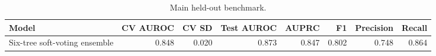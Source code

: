 \begin{table}[htbp]
\centering
\caption{Main held-out benchmark.}
\label{tab:main_benchmark_recomputed}
\begin{tabular}{lrrrrrrr}
\toprule
Model & CV AUROC & CV SD & Test AUROC & AUPRC & F1 & Precision & Recall \\
\midrule
Six-tree soft-voting ensemble & 0.848 & 0.020 & 0.873 & 0.847 & 0.802 & 0.748 & 0.864 \\
\bottomrule
\end{tabular}

\end{table}
